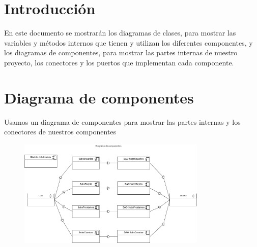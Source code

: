 \documentclass[12pt]{article}
\begin{document}
\section*{Introducción} %
En este documento se mostrarán los diagramas de clases, para mostrar las variables y métodos internos que tienen y utilizan los diferentes componentes, y los diagramas de componentes, para mostrar las partes internas de nuestro proyecto, los conectores y los puertos que implementan cada componente.

\section{Diagrama de componentes} %
Usamos un diagrama de componentes para mostrar las partes internas y los conectores de nuestros componentes
\begin{figure}[H]
    \centering
    \includegraphics[width=0.8\textwidth]{images/DiagramaDeComponentes.png}
\end{figure}

\newpage
\end{document}
